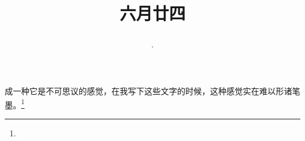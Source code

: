 \title{\date[d=29,m=7,y=2024][year:cn-y,年,month:cn,day:cn,日,·,weekday]·六月廿四 }
成一种它是不可思议的感觉，在我写下这些文字的时候，这种感觉实在难以形诸笔墨。\footnote{ }

